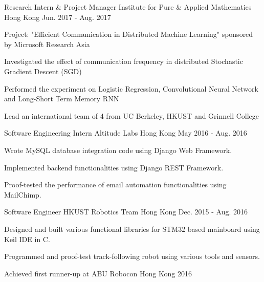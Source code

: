 

\begin{cventries}

  \cventry
    {Research Intern \& Project Manager} %
    {Institute for Pure \& Applied Mathematics} %
    {Hong Kong} %
    {Jun. 2017 - Aug. 2017} %
    {
      \begin{cvitems} %
        \item {Project: "Efficient Communication in Distributed Machine Learning" sponsored by Microsoft Research Asia}
        \item {Investigated the effect of communication frequency in distributed Stochastic Gradient Descent (SGD)}
        \item {Performed the experiment on Logistic Regression, Convolutional Neural Network and Long-Short Term Memory RNN}
        \item {Lead an international team of 4 from UC Berkeley, HKUST and Grinnell College}
      \end{cvitems}
    }

  \cventry
    {Software Engineering Intern} %
    {Altitude Labs} %
    {Hong Kong} %
    {May 2016 - Aug. 2016} %
    {
      \begin{cvitems} %
        \item {Wrote MySQL database integration code using Django Web Framework.}
        \item {Implemented backend functionalities using Django REST Framework.}
        \item {Proof-tested the performance of email automation functionalities using MailChimp.}
      \end{cvitems}
    }

  \cventry
    {Software Engineer} %
    {HKUST Robotics Team} %
    {Hong Kong} %
    {Dec. 2015 - Aug. 2016} %
    {
      \begin{cvitems} %
        \item {Designed and built various functional libraries for STM32 based mainboard using Keil IDE in C.}
        \item {Programmed and proof-test track-following robot using various tools and sensors.}
        \item {Achieved first runner-up at ABU Robocon Hong Kong 2016}
      \end{cvitems}
    }


\end{cventries}
